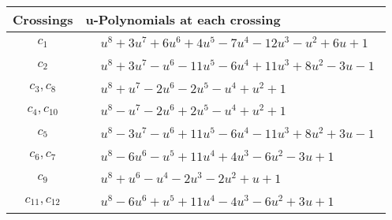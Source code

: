 \documentclass[1p]{elsarticle_modified}
\theoremstyle{definition}
\begin{document}
\begin{tabular}{m{50pt}|m{274pt}}
Crossings & \hspace{64pt}u-Polynomials at each crossing \\
\hline $$\begin{aligned}c_{1}\end{aligned}$$&$\begin{aligned}
&u^8+3 u^7+6 u^6+4 u^5-7 u^4-12 u^3- u^2+6 u+1
\end{aligned}$\\
\hline $$\begin{aligned}c_{2}\end{aligned}$$&$\begin{aligned}
&u^8+3 u^7- u^6-11 u^5-6 u^4+11 u^3+8 u^2-3 u-1
\end{aligned}$\\
\hline $$\begin{aligned}c_{3},c_{8}\end{aligned}$$&$\begin{aligned}
&u^8+u^7-2 u^6-2 u^5- u^4+u^2+1
\end{aligned}$\\
\hline $$\begin{aligned}c_{4},c_{10}\end{aligned}$$&$\begin{aligned}
&u^8- u^7-2 u^6+2 u^5- u^4+u^2+1
\end{aligned}$\\
\hline $$\begin{aligned}c_{5}\end{aligned}$$&$\begin{aligned}
&u^8-3 u^7- u^6+11 u^5-6 u^4-11 u^3+8 u^2+3 u-1
\end{aligned}$\\
\hline $$\begin{aligned}c_{6},c_{7}\end{aligned}$$&$\begin{aligned}
&u^8-6 u^6- u^5+11 u^4+4 u^3-6 u^2-3 u+1
\end{aligned}$\\
\hline $$\begin{aligned}c_{9}\end{aligned}$$&$\begin{aligned}
&u^8+u^6- u^4-2 u^3-2 u^2+u+1
\end{aligned}$\\
\hline $$\begin{aligned}c_{11},c_{12}\end{aligned}$$&$\begin{aligned}
&u^8-6 u^6+u^5+11 u^4-4 u^3-6 u^2+3 u+1
\end{aligned}$\\
\hline
\end{tabular}\\~\\
\end{document}
